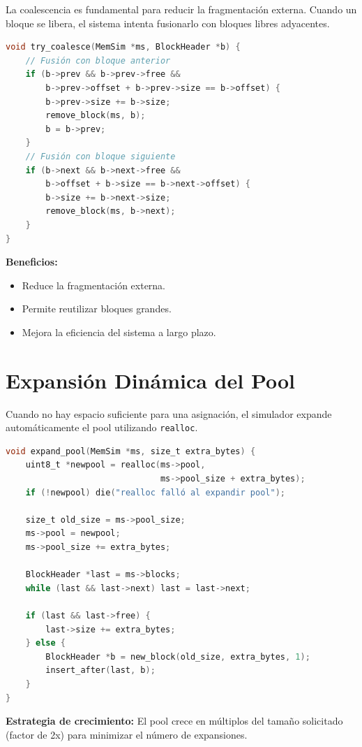 \documentclass[12pt,a4paper]{article}
\begin{document}
La coalescencia es fundamental para reducir la fragmentación externa. Cuando un bloque se libera, el sistema intenta fusionarlo con bloques libres adyacentes.

\begin{lstlisting}[language=C]
void try_coalesce(MemSim *ms, BlockHeader *b) {
    // Fusión con bloque anterior
    if (b->prev && b->prev->free &&
        b->prev->offset + b->prev->size == b->offset) {
        b->prev->size += b->size;
        remove_block(ms, b);
        b = b->prev;
    }
    // Fusión con bloque siguiente
    if (b->next && b->next->free &&
        b->offset + b->size == b->next->offset) {
        b->size += b->next->size;
        remove_block(ms, b->next);
    }
}
\end{lstlisting}

\textbf{Beneficios:}
\begin{itemize}
    \item Reduce la fragmentación externa.
    \item Permite reutilizar bloques grandes.
    \item Mejora la eficiencia del sistema a largo plazo.
\end{itemize}

\section{Expansión Dinámica del Pool}

Cuando no hay espacio suficiente para una asignación, el simulador expande automáticamente el pool utilizando \texttt{realloc}.

\begin{lstlisting}[language=C]
void expand_pool(MemSim *ms, size_t extra_bytes) {
    uint8_t *newpool = realloc(ms->pool, 
                               ms->pool_size + extra_bytes);
    if (!newpool) die("realloc falló al expandir pool");
    
    size_t old_size = ms->pool_size;
    ms->pool = newpool;
    ms->pool_size += extra_bytes;
    
    BlockHeader *last = ms->blocks;
    while (last && last->next) last = last->next;
    
    if (last && last->free) {
        last->size += extra_bytes;
    } else {
        BlockHeader *b = new_block(old_size, extra_bytes, 1);
        insert_after(last, b);
    }
}
\end{lstlisting}

\textbf{Estrategia de crecimiento:}
El pool crece en múltiplos del tamaño solicitado (factor de 2x) para minimizar el número de expansiones.
\end{document}

